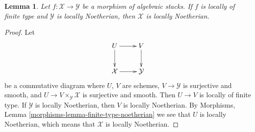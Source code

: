 \documentclass[10pt,a4paper]{amsart}
\theoremstyle{plain}
\newtheorem{lemma}[subsection]{Lemma}
\theoremstyle{definition}
\theoremstyle{remark}
\numberwithin{equation}{subsection}
\begin{document}
\begin{lemma}
\label{lemma-locally-finite-type-locally-noetherian}
Let $f : \mathcal{X} \to \mathcal{Y}$ be a morphism of algebraic stacks.
If $f$ is locally of finite type and $\mathcal{Y}$ is locally Noetherian,
then $\mathcal{X}$ is locally Noetherian.
\end{lemma}

\begin{proof}
Let
$$
\xymatrix{
U \ar[d] \ar[r] & V \ar[d] \\
\mathcal{X} \ar[r] & \mathcal{Y}
}
$$
be a commutative diagram where $U$, $V$ are schemes,
$V \to \mathcal{Y}$ is surjective and smooth, and
$U \to V \times_\mathcal{Y} \mathcal{X}$ is surjective and smooth.
Then $U \to V$ is locally of finite type. If $\mathcal{Y}$ is
locally Noetherian, then $V$ is locally Noetherian. By
Morphisms, Lemma \ref{morphisms-lemma-finite-type-noetherian}
we see that $U$ is locally Noetherian, which means that $\mathcal{X}$
is locally Noetherian.
\end{proof}
\end{document}
